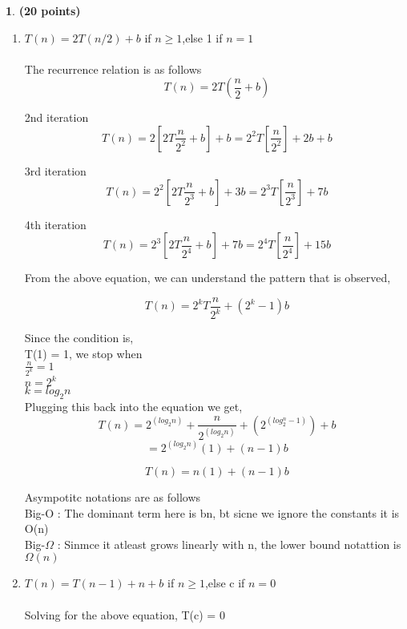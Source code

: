 \documentclass[11pt]{article}
\theoremstyle{definition}
\newtheorem{prob}{}
\newcommand{\solution}{\medskip\noindent{\color{DarkBlue}\textbf{Solution:}}}
\begin{document}
\begin{prob} \textbf{(20 points)}
\end{prob}
\begin{enumerate}
    \item $T(n)= 2T(n/2)+b$ if $n\geq1$,else 1 if $n=1$ \\
    \solution \\

    The recurrence relation is as follows \\
    \[ T(n) = 2T(\frac{n}{2} + b) \]

    2nd iteration
    \[ T(n) = 2[2T\frac{n}{2^2} + b] + b = 2^2T[\frac{n}{2^2}] + 2b + b \] 

    3rd iteration
    \[ T(n) = 2^2[2T\frac{n}{2^3} + b] + 3b = 2^3T[\frac{n}{2^3}] + 7b \] 

    4th iteration
    \[ T(n) = 2^3[2T\frac{n}{2^4} + b] + 7b = 2^4T[\frac{n}{2^4}] + 15b \] 

    From the above equation, we can understand the pattern that is observed,

    \[ T(n) = 2^kT\frac{n}{2^k} + (2^k-1)b \]

    Since the condition is, \\
    T(1) = 1, we stop when \\
    $ \frac{n}{2^k} = 1$ \\
    $n=2^k$ \\
    $ k = log_2 n$ \\

    Plugging this back into the equation we get,
    \[ T(n) = 2^(log_2 n) + \frac{n}{2^(log_2 n)} + (2^(log_2 ^n - 1)) + b\]
    \[ = 2^(log_2 n)(1) + (n-1)b \]
    
    \[ T(n) = n(1) + (n-1)b \]

    Asympotitc notations are as follows \\

    Big-O : The dominant term here is bn, bt sicne we ignore the constants it is O(n) \\
    Big-$\Omega$ : Sinmce it atleast grows linearly with n, the lower bound notattion is $\Omega(n)$\\

    \item $T(n)= T(n-1)+n+b$ if $n\geq1$,else c if $n=0$ \\
    \solution \\
    Solving for the above equation, T(c) = 0 \\


\end{enumerate}
\end{document}
